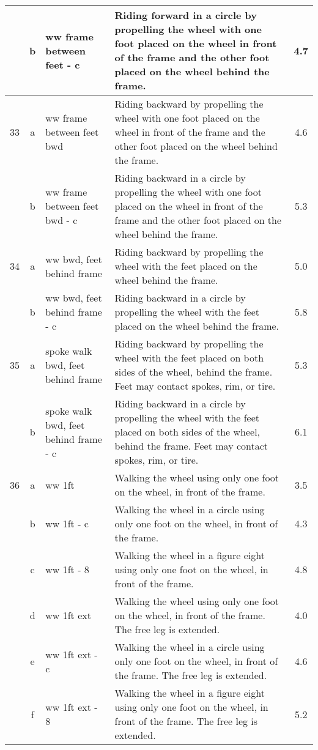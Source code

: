 \begin{longtable}{|r|c|p{4cm}|p{8cm}|c|}
\hline
  & b & ww frame between feet - c & Riding forward in a circle by propelling the wheel with one foot placed on the wheel in front of the frame and the other foot placed on the wheel behind the frame. & 4.7 \\ 
\hline
33  & a & ww frame between feet bwd & Riding backward by propelling the wheel with one foot placed on the wheel in front of the frame and the other foot placed on the wheel behind the frame.  & 4.6 \\ 
\hline
  & b & ww frame between feet bwd - c & Riding backward in a circle by propelling the wheel with one foot placed on the wheel in front of the frame and the other foot placed on the wheel behind the frame.  & 5.3 \\ 
\hline
34  & a & ww bwd, feet behind frame & Riding backward by propelling the wheel with the feet placed on the wheel behind the frame. & 5.0 \\ 
\hline
  & b & ww bwd, feet behind frame - c & Riding backward in a circle by propelling the wheel with the feet placed on the wheel behind the frame. & 5.8 \\ 
\hline
35  & a & spoke walk bwd, feet behind frame & Riding backward by propelling the wheel with the feet placed on both sides of the wheel, behind the frame. Feet may contact spokes, rim, or tire. & 5.3 \\ 
\hline
  & b & spoke walk bwd, feet behind frame - c & Riding backward in a circle by propelling the wheel with the feet placed on both sides of the wheel, behind the frame. Feet may contact spokes, rim, or tire. & 6.1 \\ 
\hline
36  & a & ww 1ft  & Walking the wheel using only one foot on the wheel, in front of the frame.  & 3.5 \\ 
\hline
  & b & ww 1ft - c  & Walking the wheel in a circle using only one foot on the wheel, in front of the frame.  & 4.3 \\ 
\hline
  & c & ww 1ft - 8  & Walking the wheel in a figure eight using only one foot on the wheel, in front of the frame.  & 4.8 \\ 
\hline
  & d & ww 1ft ext  & Walking the wheel using only one foot on the wheel, in front of the frame. The free leg is extended.  & 4.0 \\ 
\hline
  & e & ww 1ft ext - c  & Walking the wheel in a circle using only one foot on the wheel, in front of the frame. The free leg is extended.  & 4.6 \\ 
\hline
  & f & ww 1ft ext - 8  & Walking the wheel in a figure eight using only one foot on the wheel, in front of the frame. The free leg is extended.  & 5.2 \\ 

\end{longtable}
